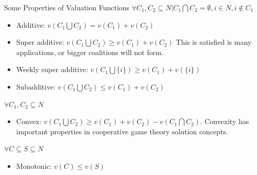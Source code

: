 \documentclass{beamer}
\begin{document}
\begin{frame}{Some Properties of Valuation Functions}
    $\forall C_1,C_2 \subseteq N | C_1 \bigcap C_2 = \emptyset, i \in N, i \notin C_1$
    \begin{itemize}
        \item {\color{blue} Additive:} $v(C_1 \bigcup C_2) = v(C_1) + v(C_2)$
        \item {\color{blue} Super additive:} $v(C_1 \bigcup C_2) \geq v(C_1) + v(C_2)$ This is satisfied is many applications, or bigger coalitions will not form.
        \item {\color{blue} Weekly super additive:} $v(C_1 \bigcup \{i\}) \geq v(C_1) + v(\{i\})$
        \item {\color{red} Subadditive:} $v(C_1 \bigcup C_2) \leq v(C_1) + v(C_2)$
    \end{itemize}

    $\forall C_1,C_2 \subseteq N$
    \begin{itemize}
        \item {\color{blue} Convex:} $v(C_1 \bigcup C_2) \geq v(C_1) + v(C_2) - v(C_1 \bigcap C_2)$. Convexity has important properties in cooperative game theory solution concepts.
    \end{itemize}

    $\forall C \subseteq S \subseteq N$
    \begin{itemize}
        \item {\color{blue} Monotonic:} $v(C) \leq v(S)$
    \end{itemize}
\end{frame}
\end{document}
